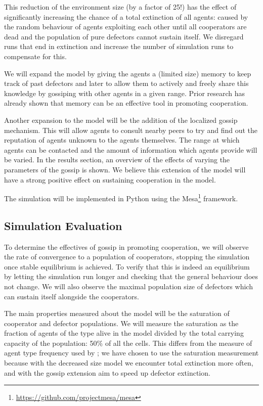 \documentclass[english]{article}
\begin{document}
This reduction of the environment size (by a factor of 25!) has the effect of significantly increasing the chance of a total extinction of all agents:
caused by the random behaviour of agents exploiting each other until all cooperators are dead and the population of pure defectors cannot sustain itself.
We disregard runs that end in extinction and increase the number of simulation runs to compensate for this.

We will expand the model by giving the agents a (limited size) memory to keep track of past defectors and later to allow them to actively and freely share this knowledge by gossiping with other agents in a given range.
Prior research \citep{memory, reciprocity, adaptive-interaction} has already shown that memory can be an effective tool in promoting cooperation.

Another expansion to the model will be the addition of the localized gossip mechanism.
This will allow agents to consult nearby peers to try and find out the reputation of agents unknown to the agents themselves.
The range at which agents can be contacted and the amount of information which agents provide will be varied.
In the results section, an overview of the effects of varying the parameters of the gossip is shown.
We believe this extension of the model will have a strong positive effect on sustaining cooperation in the model.

The simulation will be implemented in Python using the Mesa\footnote{\url{https://github.com/projectmesa/mesa}} framework.

\subsection{Simulation Evaluation}

To determine the effectives of gossip in promoting cooperation, we will observe the rate of convergence to a population of cooperators, stopping the simulation once stable equilibrium is achieved.
To verify that this is indeed an equilibrium by letting the simulation run longer and checking that the general behaviour does not change.
We will also observe the maximal population size of defectors which can sustain itself alongside the cooperators.

The main properties measured about the model will be the saturation of cooperator and defector populations.
We will measure the saturation as the fraction of agents of the type alive in the model divided by
the total carrying capacity of the population: 50\% of all the cells.
This differs from the measure of agent type frequency used by \citet{smaldino};
we have chosen to use the saturation measurement because with the decreased size model we encounter total extinction more often,
and with the gossip extension aim to speed up defector extinction.
\end{document}
